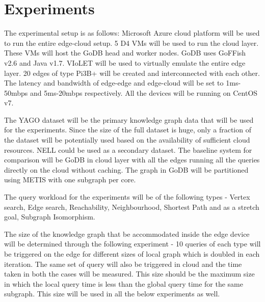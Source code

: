 \documentclass[conference]{IEEEtran}
\begin{document}
 



\section{Experiments}

The experimental setup is as follows: Microsoft Azure cloud platform will be used to run the entire edge-cloud setup. 5 D4 VMs will be used to run the cloud layer. These VMs will host the GoDB head and worker nodes. GoDB uses GoFFish v2.6 and Java v1.7. VIoLET\cite{DBLP:journals/corr/abs-1806-06032} will be used to virtually emulate the entire edge layer. 20 edges of type Pi3B+ will be created and interconnected with each other. The latency and bandwidth of edge-edge and edge-cloud will be set to 1ms-50mbps and 5ms-20mbps respectively. All the devices will be running on CentOS v7.

The YAGO dataset will be the primary knowledge graph data that will be used for the experiments. Since the size of the full dataset is huge, only a fraction of the dataset will be potentially used based on the availability of sufficient cloud resources. NELL\cite{Mitchell:2018:NL:3210350.3191513} could be used as a secondary dataset. The baseline system for comparison will be GoDB in cloud layer with all the edges running all the queries directly on the cloud without caching. The graph in GoDB will be partitioned using METIS with one subgraph per core.

The query workload for the experiments will be of the following types - Vertex search, Edge search, Reachability, Neighbourhood, Shortest Path and as a stretch goal, Subgraph Isomorphism. 

The size of the knowledge graph that be accommodated inside the edge device will be determined through the following experiment - 10 queries of each type will be triggered on the edge for different sizes of local graph which is doubled in each iteration. The same set of query will also be triggered in cloud and the time taken in both the cases will be measured. This size should be the maximum size in which the local query time is less than the global query time for the same subgraph. This size will be used in all the below experiments as well.
\end{document}
